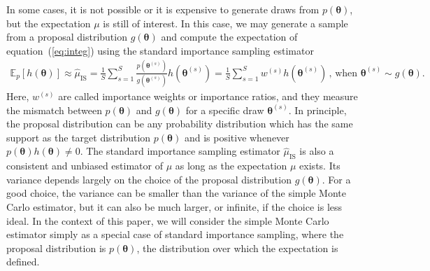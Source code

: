\documentclass[12pt]{article}
\newenvironment{nalign}{
    \begin{equation}
    \begin{aligned}
}{
    \end{aligned}
    \end{equation}
    \ignorespacesafterend
}
\begin{document}
%


%
%
In some cases, it is not possible or it is expensive to generate draws from $p (\boldsymbol{\theta})$, but
the expectation $\mu$ is still of interest. 
In this case,
we may generate a sample from a proposal distribution $g (\boldsymbol{\theta})$ and compute the expectation of equation~(\ref{eq:integ}) using the standard importance sampling estimator
\begin{nalign} \label{eq:regIS}
\mathbb{E}_p [h(\boldsymbol{\theta})] \approx \hat{\mu}_{\text{IS}} =  \frac{1}{S} \sum_{s = 1}^S \frac{ p (\boldsymbol{\theta}^{(s)} )}{g (\boldsymbol{\theta}^{(s)})} h (\boldsymbol{\theta}^{(s)})  = \frac{1}{S} \sum_{s = 1}^S w^{(s)} h (\boldsymbol{\theta}^{(s)})  \, , \, \text{when} \,  \, \boldsymbol{\theta}^{(s)}  \sim  g (\boldsymbol{\theta}) .
\end{nalign}
%
%
%
%
Here, $w^{(s)}$ are called importance weights or importance ratios, and they measure the mismatch between
$p (\boldsymbol{\theta})$ and $g (\boldsymbol{\theta})$ for a specific draw $\boldsymbol{\theta}^{(s)}$.
In principle, the proposal distribution can be any probability distribution which
has the same support as the target distribution $p (\boldsymbol{\theta})$
and is positive whenever $p (\boldsymbol{\theta}) h (\boldsymbol{\theta}) \neq 0$.
The standard importance sampling estimator $\hat{\mu}_{\text{IS}}$ is also 
a consistent and unbiased
estimator of $\mu$ as long as the expectation $\mu$ exists.
Its variance depends largely on the choice of the proposal distribution $g (\boldsymbol{\theta})$. For a good choice, the variance can be smaller than the variance 
of the simple Monte Carlo estimator, but it can also be much larger, or infinite, if the 
choice is less ideal.
%
%
%
In the context of this paper, we will consider the simple Monte Carlo estimator
simply as a special case
of standard importance sampling, where the proposal distribution is $p (\boldsymbol{\theta})$,
the distribution over which the expectation is defined.
\end{document}
